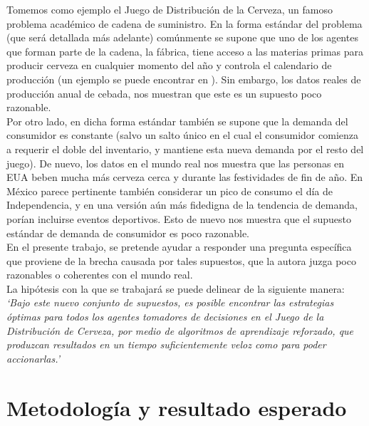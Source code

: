 Tomemos como ejemplo el Juego de Distribuci\'on de la Cerveza, un famoso problema acad\'emico de cadena de suministro. En la forma est\'andar del problema (que ser\'a detallada m\'as adelante) com\'unmente se supone que uno de los agentes que forman parte de la cadena, la f\'abrica, tiene acceso a las materias primas para producir cerveza en cualquier momento del a\~no y controla el calendario de producci\'on (un ejemplo se puede encontrar en \citet{Sterman}). Sin embargo, los datos reales de producci\'on anual de cebada, nos muestran que este es un supuesto poco razonable.\\

Por otro lado, en dicha forma est\'andar tambi\'en se supone que la demanda del consumidor es constante (salvo un salto \'unico en el cual el consumidor comienza a requerir el doble del inventario, y mantiene esta nueva demanda por el resto del juego). De nuevo, los datos en el mundo real nos muestra que las personas en EUA beben mucha m\'as cerveza cerca y durante las festividades de fin de a\~no. En M\'exico parece pertinente tambi\'en considerar un pico de consumo el d\'ia de Independencia, y en una versi\'on a\'un m\'as fidedigna de la tendencia de demanda, por\'ian incluirse eventos deportivos. Esto de nuevo nos muestra que el supuesto est\'andar de demanda de consumidor es poco razonable.\\

En el presente trabajo, se pretende ayudar a responder una pregunta espec\'ifica que proviene de la brecha causada por tales supuestos, que la autora juzga poco razonables o coherentes con el mundo real.\\

La hip\'otesis con la que se trabajar\'a se puede delinear de la siguiente manera:\\

\textit{`Bajo este nuevo conjunto de supuestos, es posible encontrar las estrategias \'optimas para todos los agentes tomadores de decisiones en el Juego de la Distribuci\'on de Cerveza, por medio de algoritmos de aprendizaje reforzado, que produzcan resultados en un tiempo suficientemente veloz como para poder accionarlas.'}\\

\section{Metodolog\'ia y resultado esperado}

